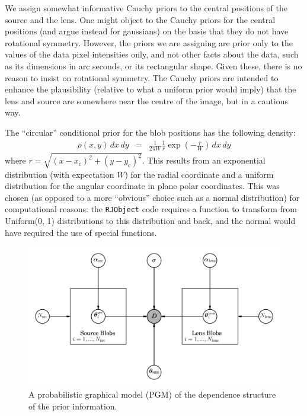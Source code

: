 \documentclass[useAMS,usenatbib]{mn2e}
\begin{document}
We assign somewhat informative Cauchy priors to the central positions of the
source and the lens.
One might object to the Cauchy priors
for the central positions (and argue instead for gaussians) on the
basis that they do not have rotational symmetry. However, the priors we
are assigning are prior only to the values of the data pixel intensities only,
and not other facts about the data, such as its dimensions in arc seconds, or its
rectangular shape. Given these, there is no reason to insist on rotational
symmetry. The Cauchy priors are intended to enhance the plausibility
(relative to what a uniform prior would imply) that the
lens and source are somewhere near the centre of the image, but in a cautious
way.

The ``circular'' conditional prior for the blob positions has the following
density:
\begin{eqnarray}
\rho(x, y)\, dx \, dy &=&
\frac{1}{2\pi W} \frac{1}{r}\exp\left(-\frac{r}{W}\right) \, dx \, dy
\end{eqnarray}
where $r = \sqrt{(x-x_c)^2 + (y-y_c)^2}$. This results from an exponential
distribution (with expectation $W$) for the radial coordinate and a uniform distribution for the angular coordinate in plane polar coordinates. This was
chosen (as opposed to a more ``obvious'' choice such as a normal distribution)
for computational reasons: the {\tt RJObject} code requires a function to
transform from Uniform(0, 1) distributions to this distribution and back, and
the normal would have required the use of special functions.

\begin{figure}
\includegraphics{pgm.pdf}
\caption{A probabilistic graphical model (PGM) of the dependence structure
of the prior information.\label{fig:pgm}}
\end{figure}
\end{document}
